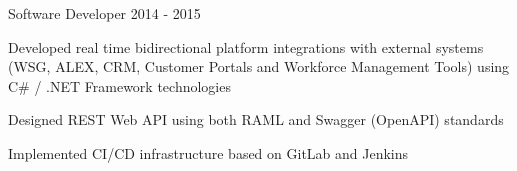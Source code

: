 \begin{cventries}
  \cventry
    {Software Developer} %
    {} %
    {} %
    {} %
    {2014 - 2015} %
    {
      \begin{cvitems} %
        \item {Developed real time bidirectional platform integrations with external systems (WSG, ALEX, CRM, Customer Portals and Workforce Management Tools) using C\# / .NET Framework technologies}
        \item {Designed REST Web API using both RAML and Swagger (OpenAPI) standards}
        \item {Implemented CI/CD infrastructure based on GitLab and Jenkins}
      \end{cvitems}
    }

\end{cventries}
